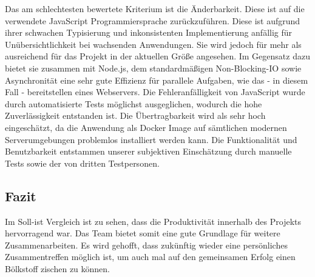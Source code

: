 Das am schlechtesten bewertete Kriterium ist die Änderbarkeit.
Diese ist auf die verwendete JavaScript Programmiersprache zurückzuführen.
Diese ist aufgrund ihrer schwachen Typisierung und inkonsistenten Implementierung anfällig für Unübersichtlichkeit bei wachsenden Anwendungen.
Sie wird jedoch für mehr als ausreichend für das Projekt in der aktuellen Größe angesehen.
Im Gegensatz dazu bietet sie zusammen mit Node.js, dem standardmäßigen Non-Blocking-IO sowie
Asynchronität eine sehr gute Effizienz für parallele Aufgaben, wie das - in diesem Fall - bereitstellen eines Webservers.
Die Fehleranfälligkeit von JavaScript wurde durch automatisierte Tests möglichst ausgeglichen, wodurch die hohe Zuverlässigkeit
entstanden ist.
Die Übertragbarkeit wird als sehr hoch eingeschätzt, da die Anwendung als Docker Image auf sämtlichen modernen
Serverumgebungen problemlos installiert werden kann.
Die Funktionalität und Benutzbarkeit entstammen unserer subjektiven Einschätzung durch manuelle Tests sowie der von
dritten Testpersonen.
\\

\subsection{Fazit}\label{subsec:fazit}%
Im Soll-ist Vergleich ist zu sehen, dass die Produktivität innerhalb des Projekts hervorragend war. Das Team bietet somit eine
gute Grundlage für weitere Zusammenarbeiten. Es wird gehofft, dass zukünftig wieder eine persönliches Zusammentreffen möglich ist,
um auch mal auf den gemeinsamen Erfolg einen Bölkstoff zischen zu können.

